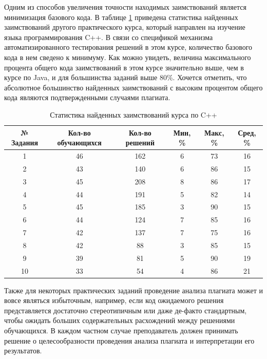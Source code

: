 \documentclass[a4paper,14pt]{extarticle}
\begin{document}
Одним из способов увеличения точности находимых заимствований является минимизация базового кода. В таблице \ref{tab:cppCourseStats} приведена статистика найденных заимствований другого практического курса, который направлен на изучение языка программирования C++. В связи со спецификой механизма автоматизированного тестирования решений в этом курсе, количество базового кода в нем сведено к минимуму. Как можно увидеть, величина максимального процента общего кода заимствований в этом курсе значительно выше, чем в курсе по Java, и для большинства заданий выше 80\%. Хочется отметить, что абсолютное большинство найденных заимствований с высоким процентом общего кода являются подтвержденными случаями плагиата.

\begin{table}[htb]
    \centering
    \begin{tabular}{cccccc}
        \toprule
        № Задания & Кол-во обучающихся & Кол-во решений & Мин, \% & Макс, \% & Сред, \% \\
        \toprule
        1 & 46 & 162 & 6 & 73 & 16 \\
        \midrule
        2 & 43 & 140 & 6 & 86 & 15 \\
        \midrule
        3 & 45 & 208 & 8 & 86 & 17 \\
        \midrule
        4 & 44 & 191 & 5 & 82 & 14 \\
        \midrule
        5 & 45 & 185 & 3 & 90 & 15 \\
        \midrule
        6 & 44 & 124 & 7 & 85 & 16 \\
        \midrule
        7 & 42 & 137 & 7 & 75 & 16 \\
        \midrule
        8 & 42 & 88 & 3 & 85 & 15 \\
        \midrule
        9 & 39 & 81 & 5 & 90 & 19 \\
        \midrule
        10 & 33 & 54 & 4 & 86 & 21 \\
        \bottomrule
    \end{tabular}
    \caption{Статистика найденных заимствований курса по C++}
    \label{tab:cppCourseStats}
\end{table}

Также для некоторых практических заданий проведение анализа плагиата может и вовсе являться избыточным, например, если код ожидаемого решения представляется достаточно стереотипичным или даже де-факто стандартным, чтобы ожидать больших содержательных расхождений между решениями обучающихся. В каждом частном случае преподаватель должен принимать решение о целесообразности проведения анализа плагиата и интерпретации его результатов.
\end{document}
